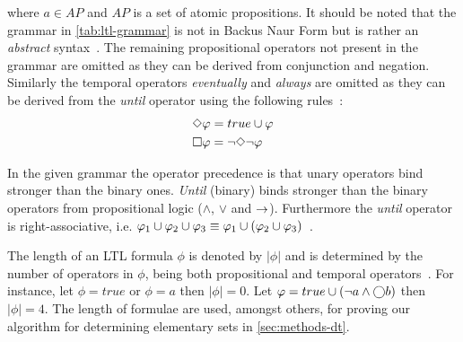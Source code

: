 

where $a \in AP$ and $AP$ is a set of atomic propositions. It should be noted that the grammar in \autoref{tab:ltl-grammar} is not in Backus Naur Form but is rather an \emph{abstract} syntax~\cite{baier2008principles}. The remaining propositional operators not present in the grammar are omitted as they can be derived from conjunction and negation. Similarly the temporal operators \emph{eventually} and \emph{always} are omitted as they can be derived from the \emph{until} operator using the following rules~\cite[pp.~232]{baier2008principles}:
\begin{align}
    &\Diamond \varphi = true \cup \varphi \label{eq:eventually} \\
    &\square \varphi = \lnot \Diamond \lnot \varphi \label{eq:always}
\end{align}

In the given grammar the operator precedence is that unary operators bind stronger than the binary ones. \emph{Until} (binary) binds stronger than the binary operators from propositional logic ($\land$, $\lor$ and $\rightarrow$). Furthermore the \emph{until} operator is right-associative, i.e. $\varphi_1 \cup \varphi_2 \cup \varphi_3 \equiv \varphi_1 \cup \left(\varphi_2 \cup \varphi_3\right)$~\cite{baier2008principles}.

The length of an LTL formula $\phi$ is denoted by $| \phi |$ and is determined by the number of operators in $\phi$, being both propositional and temporal operators~\cite{baier2008principles}. For instance, let $\phi= true$ or $\phi= a$ then $| \phi | = 0$. Let $\varphi= true \cup \left( \lnot a \land \bigcirc b \right)$ then $| \phi | = 4$. The length of formulae are used, amongst others, for proving our algorithm for determining elementary sets in \autoref{sec:methods-dt}.

